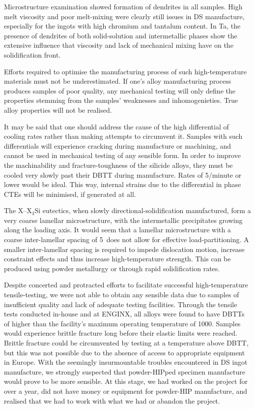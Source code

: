 Microstructure examination showed formation of dendrites in all samples.  High melt viscosity and poor melt-mixing were clearly still issues in DS manufacture, especially for the ingots with high chromium and tantalum content.  In Ta, the presence of dendrites of both solid-solution and intermetallic phases show the extensive influence that viscosity and lack of mechanical mixing have on the solidification front.

Efforts required to optimise the manufacturing process of such high-temperature materials must not be underestimated.  If one’s alloy manufacturing process produces samples of poor quality, any mechanical testing will only define the properties stemming from the samples’ weaknesses and inhomogenieties.  True alloy properties will not be realised. 

It may be said that one should address the cause of the high differential of cooling rates rather than making attempts to circumvent it.  Samples with such differentials will experience cracking during manufacture or machining, and cannot be used in mechanical testing of any sensible form.  In order to improve the machinability and fracture-toughness of the silicide alloys, they must be cooled very slowly past their DBTT during manufacture.  Rates of 5\celsius/minute or lower would be ideal.  This way, internal strains due to the differential in phase CTEs will be minimised, if generated at all.

The X--X$_3$Si eutectics, when slowly directional-solidification manufactured, form a very coarse lamellar microstructure, with the intermetallic precipitates growing along the loading axis.  It would seem that a lamellar microstructure with a coarse inter-lamellar spacing of 5\micro\metre\ does not allow for effective load-partitioning.  A smaller inter-lamellar spacing is required to impede dislocation motion, increase constraint effects and thus increase high-temperature strength.  This can be produced using powder metallurgy or through rapid solidification rates.

Despite concerted and protracted efforts to facilitate successful high-temperature tensile-testing, we were not able to obtain any sensible data due to samples of insufficient quality and lack of adequate testing facilities.  Through the tensile tests conducted in-house and at ENGINX, all alloys were found to have DBTTs of higher than the facility's maximum operating temperature of 1000\celsius.  Samples would experience brittle fracture long before their elastic limits were reached.  Brittle fracture could be circumvented by testing at a temperature above DBTT, but this was not possible due to the absence of access to appropriate equipment in Europe.  With the seemingly insurmountable troubles encountered in DS ingot manufacture, we strongly suspected that powder-HIPped specimen manufacture would prove to be more sensible.  At this stage, we had worked on the project for over a year, did not have money or equipment for powder-HIP manufacture, and realised that we had to work with what we had or abandon the project.

